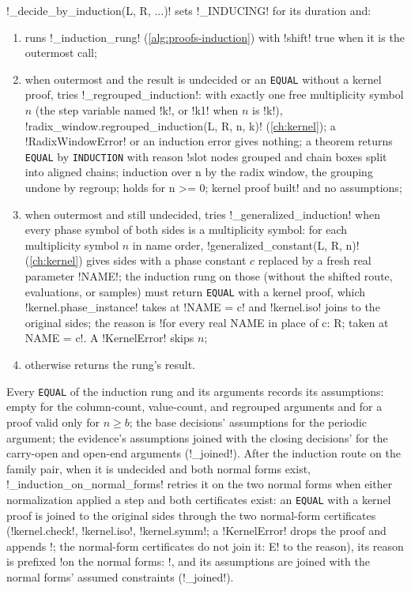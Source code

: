\begin{algorithm}\label{alg:proofs-induction-routes}
\py!_decide_by_induction(L, R, ...)! sets \py!_INDUCING! for its duration and:
\begin{enumerate}
\item runs \py!_induction_rung! (\cref{alg:proofs-induction}) with \py!shift! true when it is the outermost call;
\item when outermost and the result is undecided or an \texttt{EQUAL} without a kernel proof, tries \py!_regrouped_induction!: with exactly one free multiplicity symbol $n$ (the step variable named \code!k!, or \code!k1! when $n$ is \code!k!), \py!radix_window.regrouped_induction(L, R, n, k)! (\cref{ch:kernel}); a \py!RadixWindowError! or an induction error gives nothing; a theorem returns \texttt{EQUAL} by \texttt{INDUCTION} with reason \code!slot nodes grouped and chain boxes split into aligned chains; induction over n by the radix window, the grouping undone by regroup; holds for n >= 0; kernel proof built! and no assumptions;
\item when outermost and still undecided, tries \py!_generalized_induction! when every phase symbol of both sides is a multiplicity symbol: for each multiplicity symbol $n$ in name order, \py!generalized_constant(L, R, n)! (\cref{ch:kernel}) gives sides with a phase constant $c$ replaced by a fresh real parameter \code!NAME!; the induction rung on those (without the shifted route, evaluations, or samples) must return \texttt{EQUAL} with a kernel proof, which \py!kernel.phase_instance! takes at \code!NAME = c! and \py!kernel.iso! joins to the original sides; the reason is \code!for every real NAME in place of c: R; taken at NAME = c!. A \py!KernelError! skips $n$;
\item otherwise returns the rung's result.
\end{enumerate}
Every \texttt{EQUAL} of the induction rung and its arguments records its assumptions: empty for the column-count, value-count, and regrouped arguments and for a proof valid only for $n\ge b$; the base decisions' assumptions for the periodic argument; the evidence's assumptions joined with the closing decisions' for the carry-open and open-end arguments (\py!_joined!).
After the induction route on the family pair, when it is undecided and both normal forms exist, \py!_induction_on_normal_forms! retries it on the two normal forms when either normalization applied a step and both certificates exist: an \texttt{EQUAL} with a kernel proof is joined to the original sides through the two normal-form certificates (\py!kernel.check!, \py!kernel.iso!, \py!kernel.symm!; a \py!KernelError! drops the proof and appends \code!; the normal-form certificates do not join it: E! to the reason), its reason is prefixed \code!on the normal forms: !, and its assumptions are joined with the normal forms' assumed constraints (\py!_joined!).
\end{algorithm}

